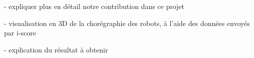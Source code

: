 - expliquer plus en détail notre contribution dans ce projet

- visualisation en 3D de la chorégraphie des robots, à l'aide des données envoyés par i-score 

- explication du résultat à obtenir
